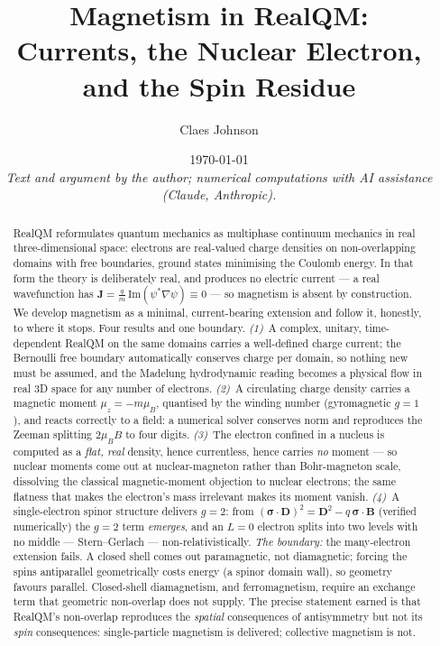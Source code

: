 \documentclass[11pt]{article}
\title{Magnetism in RealQM:\\
Currents, the Nuclear Electron, and the Spin Residue}
\author[1]{Claes Johnson}
\affil[1]{KTH Royal Institute of Technology, SE-100 44 Stockholm, Sweden \\
\texttt{claesjohnson@gmail.com}}
\date{\today \\[0.4em]
\small\textit{Text and argument by the author; numerical computations with AI assistance (Claude, Anthropic).}}
\begin{document}
\maketitle

\begin{abstract}
RealQM reformulates quantum mechanics as multiphase continuum mechanics in real three-dimensional space:
electrons are real-valued charge densities on non-overlapping domains with free boundaries, ground states
minimising the Coulomb energy. In that form the theory is deliberately real, and produces no electric
current --- a real wavefunction has $\mathbf J=\frac{q}{m}\,\mathrm{Im}(\psi^*\nabla\psi)\equiv 0$ --- so
magnetism is absent by construction. We develop magnetism as a minimal, current-bearing extension and
follow it, honestly, to where it stops. Four results and one boundary. \emph{(1)}~A complex,
unitary, time-dependent RealQM on the same domains carries a well-defined charge current; the Bernoulli
free boundary automatically conserves charge per domain, so nothing new must be assumed, and the Madelung
hydrodynamic reading becomes a physical flow in real 3D space for any number of electrons. \emph{(2)}~A
circulating charge density carries a magnetic moment $\mu_z=-m\mu_B$, quantised by the winding number
(gyromagnetic $g=1$), and reacts correctly to a field: a numerical solver conserves norm and reproduces
the Zeeman splitting $2\mu_B B$ to four digits. \emph{(3)}~The electron confined in a nucleus is computed
as a \emph{flat, real} density, hence currentless, hence carries \emph{no} moment --- so nuclear moments
come out at nuclear-magneton rather than Bohr-magneton scale, dissolving the classical magnetic-moment
objection to nuclear electrons; the same flatness that makes the electron's mass irrelevant makes its
moment vanish. \emph{(4)}~A single-electron spinor structure delivers $g=2$: from
$(\boldsymbol\sigma\cdot\mathbf D)^2=\mathbf D^2-q\,\boldsymbol\sigma\cdot\mathbf B$ (verified
numerically) the $g=2$ term \emph{emerges}, and an $L=0$ electron splits into two levels with no middle
--- Stern--Gerlach --- non-relativistically. \emph{The boundary:} the many-electron extension fails.
A closed shell comes out paramagnetic, not diamagnetic; forcing the spins antiparallel geometrically
costs energy (a spinor domain wall), so geometry favours parallel. Closed-shell diamagnetism, and
ferromagnetism, require an exchange term that geometric non-overlap does not supply. The precise
statement earned is that RealQM's non-overlap reproduces the \emph{spatial} consequences of antisymmetry
but not its \emph{spin} consequences: single-particle magnetism is delivered; collective magnetism is not.
\end{abstract}
\end{document}
